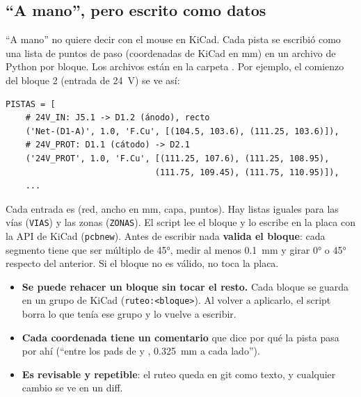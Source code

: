 \subsection{``A mano'', pero escrito como datos}

``A mano'' no quiere decir con el mouse en KiCad. Cada pista se escribió como una lista de puntos de paso (coordenadas
de KiCad en mm) en un archivo de Python por bloque. Los archivos están en la carpeta
. Por ejemplo, el comienzo del bloque 2 (entrada de \SI{24}{\volt}) se ve así:

\begin{small}
\begin{verbatim}
PISTAS = [
    # 24V_IN: J5.1 -> D1.2 (ánodo), recto
    ('Net-(D1-A)', 1.0, 'F.Cu', [(104.5, 103.6), (111.25, 103.6)]),
    # 24V_PROT: D1.1 (cátodo) -> D2.1
    ('24V_PROT', 1.0, 'F.Cu', [(111.25, 107.6), (111.25, 108.95),
                              (111.75, 109.45), (111.75, 110.95)]),
    ...
\end{verbatim}
\end{small}

Cada entrada es (red, ancho en mm, capa, puntos). Hay listas iguales para las vías (\texttt{VIAS}) y las zonas
(\texttt{ZONAS}). El script  lee el bloque y lo escribe en la placa con la API de
KiCad (\texttt{pcbnew}). Antes de escribir nada \textbf{valida el bloque}: cada segmento tiene que ser múltiplo de
\ang{45}, medir al menos \SI{0.1}{\milli\meter} y girar \ang{0} o \ang{45} respecto del anterior. Si el bloque no es
válido, no toca la placa.

\begin{idea}
\begin{itemize}
  \item \textbf{Se puede rehacer un bloque sin tocar el resto.} Cada bloque se guarda en un grupo de KiCad
  (\texttt{ruteo:<bloque>}). Al volver a aplicarlo, el script borra lo que tenía ese grupo y lo vuelve a escribir.
  \item \textbf{Cada coordenada tiene un comentario} que dice por qué la pista pasa por ahí (``entre los pads de
   y , \SI{0.325}{\milli\meter} a cada lado'').
  \item \textbf{Es revisable y repetible}: el ruteo queda en git como texto, y cualquier cambio se ve en un diff.
\end{itemize}
\end{idea}

